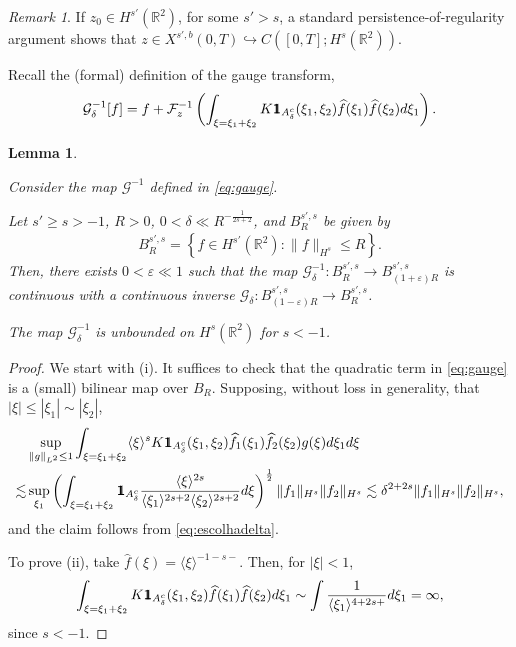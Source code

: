 \documentclass[a4paper,
11pt,  reqno]{amsart}
\newcommand{\mathbbm}[1]{\mathchoice%
    {\hbox{\sffamily 1\kern-.40em 1}}%
    {\hbox{\sffamily 1\kern-.40em 1}}%
    {\hbox{\scriptsize\sffamily 1\kern-.30em 1}}%
    {\hbox{\tiny\sffamily 1\kern-.25em 1}}}%
\newcommand{\jap}[1]{\langle #1 \rangle}
\newcommand{\5}{\textup{V}}
\newcommand{\noi}{\noindent}
\newcommand{\ind}{\mathbbm 1}
\newcommand{\dl}{\delta}
\newcommand{\F}{\mathcal{F}}
\newcommand{\eps}{\varepsilon}
\newtheorem{lemma}[theorem]{Lemma}
\theoremstyle{remark}
\newtheorem{remark}[theorem]{Remark}
\newcommand{\R}{\mathbb{R}}
\newcommand{\Gc}{\mathcal{G}}
\numberwithin{equation}{section}
\numberwithin{theorem}{section}
\begin{document}
\begin{remark}\label{remark:persistence}
If $z_0\in H^{s'}(\R^2)$, for some $s'>s$, a standard persistence-of-regularity argument shows that $z\in X^{s',b}(0,T) \hookrightarrow C([0,T]; H^s(\R^2))$.
\end{remark}


Recall the (formal) definition of the gauge transform,
\begin{equation}\label{eq:gauge}
\mathcal{G}_\delta^{-1}[f]=f+\F_{z}^{-1}\left(\int_{\xi=\xi_1+\xi_2} K\mathbbm{1}_{A^c_\delta}(\xi_1,\xi_2)\widehat{f}(\xi_1)\widehat{f}(\xi_2)d\xi_1\right).
\end{equation}



\begin{lemma}\label{LEM:D}

Consider the map  $\Gc^{-1}$ defined in \eqref{eq:gauge}.

\smallskip



\noi {\rm(i)}
Let $s' \ge s>-1$, $R>0$, $0<\dl \ll R^{-\frac{1}{2s+2}}$, and $B^{s',s}_R$ be given by
\begin{align}
\label{Bss}
B^{s',s}_R=\left\{ f\in H^{s'}(\R^2): \|f\|_{H^s} \le R \right\}.
\end{align}
Then, there exists $0<\eps\ll 1$ such that the map $\Gc_\dl^{-1}: B^{s',s}_R \to B^{s',s}_{(1+\eps)R}$ is continuous with a continuous inverse $\Gc_\dl: B^{s',s}_{(1-\eps)R} \to B^{s',s}_R$.

\smallskip
\noi {\rm(ii)} The map $\Gc_\dl^{-1}$ is unbounded on $H^s(\R^2)$ for $s< - 1$.


\end{lemma}

\begin{proof}
We start with (i). It suffices to check that the quadratic term in \eqref{eq:gauge} is a (small) bilinear map over $B_R$. Supposing, without loss in generality, that $|\xi|\le |\xi_1|\sim |\xi_2|$,
\begin{align*}
&\sup_{\|g\|_{L^2}\le 1} \int_{\xi=\xi_1+\xi_2} \jap{\xi}^sK\mathbbm{1}_{A^c_\delta}(\xi_1,\xi_2)\widehat{f}_1(\xi_1)\widehat{f}_2(\xi_2)g(\xi)d\xi_1d\xi \\\lesssim & \sup_{\xi_1} \left(\int_{\xi=\xi_1+\xi_2} \mathbbm{1}_{A^c_\delta} \frac{\jap{\xi}^{2s}}{\jap{\xi_1}^{2s+2}\jap{\xi_2}^{2s+2}}d\xi\right)^{\frac12}\|f_1\|_{H^s}\|f_2\|_{H^s} \lesssim \delta^{2+2s}\|f_1\|_{H^s}\|f_2\|_{H^s},
\end{align*}
and the claim follows from \eqref{eq:escolhadelta}.

To prove (ii), take $\widehat{f}(\xi)=\jap{\xi}^{-1-s-}$. Then, for $|\xi|<1$,
$$
\int_{\xi=\xi_1+\xi_2} K\ind_{A^c_\dl}(\xi_1,\xi_2)\widehat{f}(\xi_1)\widehat{f}(\xi_2)d\xi_1 \sim \int \frac{1}{\jap{\xi_1}^{4+2s+}}d\xi_1 = \infty,
$$
since $s<-1$.
\end{proof}
\end{document}
